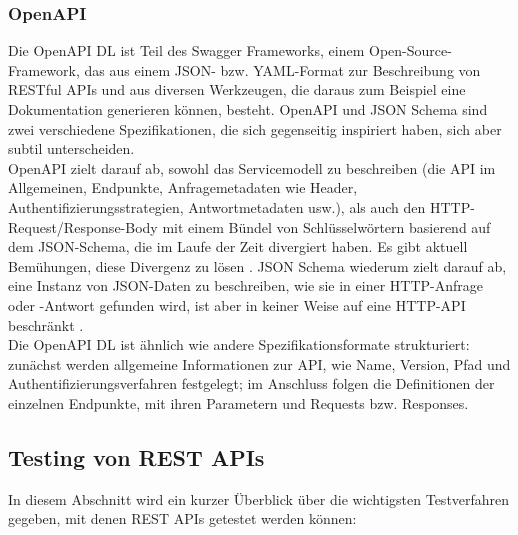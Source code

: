 \subsubsection{OpenAPI}

Die OpenAPI DL ist Teil des Swagger Frameworks, einem Open-Source-Framework, das aus einem JSON- bzw. YAML-Format zur Beschreibung von RESTful APIs und aus diversen Werkzeugen, die daraus zum Beispiel eine Dokumentation generieren können, besteht. OpenAPI und JSON Schema sind zwei verschiedene Spezifikationen, die sich gegenseitig inspiriert haben, sich aber subtil unterscheiden. \\

OpenAPI zielt darauf ab, sowohl das Servicemodell zu beschreiben (die API im Allgemeinen, Endpunkte, Anfragemetadaten wie Header, Authentifizierungsstrategien, Antwortmetadaten usw.), als auch den HTTP-Request/Response-Body mit einem Bündel von Schlüsselwörtern basierend auf dem JSON-Schema, die im Laufe der Zeit divergiert haben. Es gibt aktuell Bemühungen, diese Divergenz zu lösen \parencite{sturgeon2018divergence}. JSON Schema wiederum zielt darauf ab, eine Instanz von JSON-Daten zu beschreiben, wie sie in einer HTTP-Anfrage oder -Antwort gefunden wird, ist aber in keiner Weise auf eine HTTP-API beschränkt \parencite{sturgeon2018harmony}. \\

Die OpenAPI DL ist ähnlich wie andere Spezifikationsformate strukturiert: zunächst werden allgemeine Informationen zur API, wie Name, Version, Pfad und Authentifizierungsverfahren festgelegt; im Anschluss folgen die Definitionen der einzelnen Endpunkte, mit ihren Parametern und Requests bzw. Responses.

\subsection{Testing von REST APIs}

In diesem Abschnitt wird ein kurzer Überblick über die wichtigsten Testverfahren gegeben, mit denen REST APIs getestet werden können:

